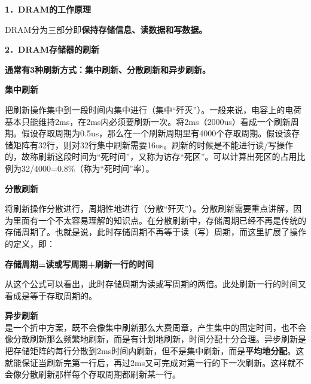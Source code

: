 \textbf{{1．DRAM的工作原理}}

DRAM分为三部分即\textbf{保持存储信息、读数据和写数据。}

\textbf{{2．DRAM存储器的刷新}}

\textbf{通常有3种刷新方式：集中刷新、分散刷新和异步刷新。}

\textbf{{集中刷新}}

把刷新操作集中到一段时间内集中进行（集中``歼灭''）。一般来说，电容上的电荷基本只能维持2ms，在2ms内必须要刷新一次。将2ms（2000us）看成一个刷新周期。假设存取周期为0.5us，那么在一个刷新周期里有4000个存取周期。假设该存储矩阵有32行，则对32行集中刷新需要16us。刷新的时候是不能进行读/写操作的，故称刷新这段时间为``死时间''，又称为访存``死区''。可以计算出死区的占用比例为32/4000=0.8\%（称为``死时间''率）。

\textbf{{分散刷新}}

将刷新操作分散进行，周期性地进行（分散``歼灭''）。分散刷新需要重点讲解，因为里面有一个不太容易理解的知识点。在分散刷新中，存储周期已经不再是传统的存储周期了。也就是说，此时存储周期不再等于读（写）周期，而这里扩展了操作的定义，即：

\textbf{{存储周期=读或写周期+刷新一行的时间}}

从这个公式可以看出，此时存储周期为读或写周期的两倍。此处刷新一行的时间又看成是等于存取周期的。

\textbf{{异步刷新}}\\

是一个折中方案，既不会像集中刷新那么大费周章，产生集中的固定时间，也不会像分散刷新那么频繁地刷新，而是有计划地刷新，时间分配十分合理。异步刷新是把存储矩阵的每行分散到2ms时间内刷新，但不是集中刷新，而是\textbf{{平均地分配}}{。}这就能保证当刷新完第一行后，再过2ms又可完成对第一行的下一次刷新。这样就不会像分散刷新那样每个存取周期都刷新某一行。
